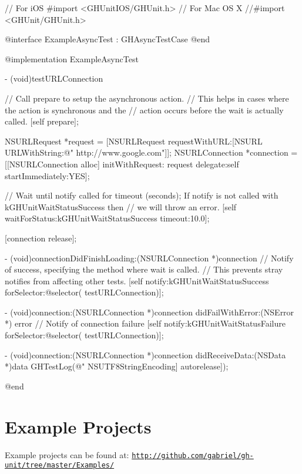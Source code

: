 \begin{DoxyCode}
 // For iOS
 #import <GHUnitIOS/GHUnit.h> 
 // For Mac OS X
 //#import <GHUnit/GHUnit.h> 
 
 @interface ExampleAsyncTest : GHAsyncTestCase { }
 @end
 
 @implementation ExampleAsyncTest
  
 - (void)testURLConnection {
   
   // Call prepare to setup the asynchronous action.
   // This helps in cases where the action is synchronous and the
   // action occurs before the wait is actually called.
   [self prepare];

   NSURLRequest *request = [NSURLRequest requestWithURL:[NSURL URLWithString:@"
      http://www.google.com"]];
   NSURLConnection *connection = [[NSURLConnection alloc] initWithRequest:
      request delegate:self startImmediately:YES];

   // Wait until notify called for timeout (seconds); If notify is not called
       with kGHUnitWaitStatusSuccess then
   // we will throw an error.
   [self waitForStatus:kGHUnitWaitStatusSuccess timeout:10.0];

   [connection release];
 }
 
 - (void)connectionDidFinishLoading:(NSURLConnection *)connection {
   // Notify of success, specifying the method where wait is called.
   // This prevents stray notifies from affecting other tests.
   [self notify:kGHUnitWaitStatusSuccess forSelector:@selector(
      testURLConnection)];
 }
 
 - (void)connection:(NSURLConnection *)connection didFailWithError:(NSError *)
      error {
   // Notify of connection failure
   [self notify:kGHUnitWaitStatusFailure forSelector:@selector(
      testURLConnection)];
 }
 
 - (void)connection:(NSURLConnection *)connection didReceiveData:(NSData *)data
       {
   GHTestLog(@"%
      NSUTF8StringEncoding] autorelease]);
 } 
 
 @end
\end{DoxyCode}
\hypertarget{_examples_ExampleProjects}{}\section{\-Example Projects}\label{_examples_ExampleProjects}
\-Example projects can be found at\-: \href{http://github.com/gabriel/gh-unit/tree/master/Examples/}{\tt http\-://github.\-com/gabriel/gh-\/unit/tree/master/\-Examples/} 